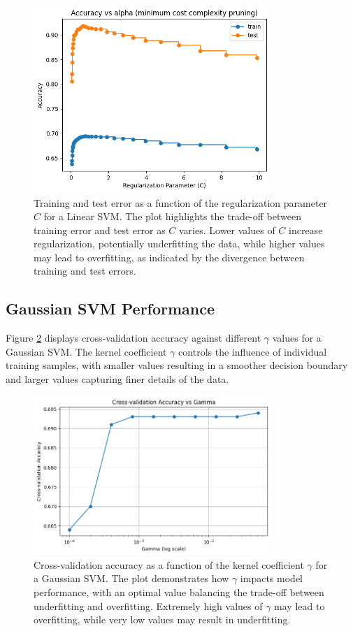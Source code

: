 \documentclass{article}
\begin{document}
\begin{figure}[H]
    \centering
    \includegraphics[width=0.8\textwidth]{training_test_error_C.png}
    \caption{Training and test error as a function of the regularization parameter $C$ for a Linear SVM. The plot highlights the trade-off between training error and test error as $C$ varies. Lower values of $C$ increase regularization, potentially underfitting the data, while higher values may lead to overfitting, as indicated by the divergence between training and test errors.}
    \label{fig:svm_error}
\end{figure}

\subsection{Gaussian SVM Performance}
Figure \ref{fig:gaussian_gamma} displays cross-validation accuracy against different $\gamma$ values for a Gaussian SVM. The kernel coefficient $\gamma$ controls the influence of individual training samples, with smaller values resulting in a smoother decision boundary and larger values capturing finer details of the data.

\begin{figure}[H]
    \centering
    \includegraphics[width=0.8\textwidth]{crossval_accuracy_gamma.png}
    \caption{Cross-validation accuracy as a function of the kernel coefficient $\gamma$ for a Gaussian SVM. The plot demonstrates how $\gamma$ impacts model performance, with an optimal value balancing the trade-off between underfitting and overfitting. Extremely high values of $\gamma$ may lead to overfitting, while very low values may result in underfitting.}
    \label{fig:gaussian_gamma}
\end{figure}
\end{document}
